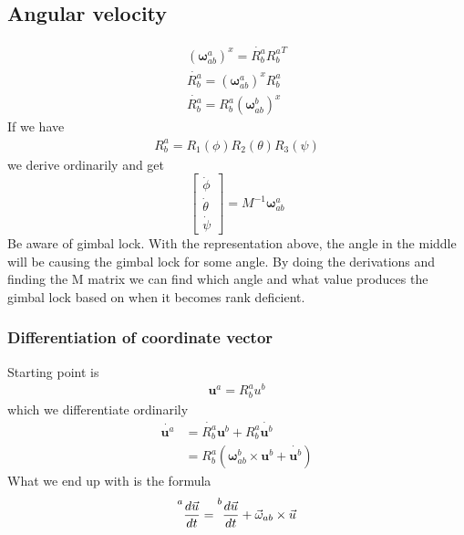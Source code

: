 \subsection{Angular velocity}
\begin{align}
    (\boldsymbol{\omega}_{ab}^a)^x=\dot{R_b^a} {R_b^a}^T \\
    \dot{R_b^a}=(\boldsymbol{\omega}_{ab}^a)^x R_b^a \\
    \dot{R_b^a}=R_b^a (\boldsymbol{\omega}_{ab}^b)^x 
\end{align}
If we have 
\begin{align}
    R_b^a = R_1(\phi) R_2(\theta) R_3(\psi)
\end{align}
we derive ordinarily and get
\begin{equation*}
    \begin{bmatrix}
    \dot{\phi} \\
    \dot{\theta} \\
    \dot{\psi}
    \end{bmatrix}
    =
    M^{-1}\boldsymbol{\omega}_{ab}^a
\end{equation*}
Be aware of gimbal lock. With the representation above, the angle in the middle will be causing the gimbal lock for some angle. By doing the derivations and finding the M matrix we can find which angle and what value produces the gimbal lock based on when it becomes rank deficient.

\subsubsection{Differentiation of coordinate vector}
Starting point is
\begin{align}
    \mathbf{u}^a=R_b^a u^b
\end{align}
which we differentiate ordinarily
\begin{align}
    \dot{\mathbf{u}^a} & =\dot{R_b^a}\mathbf{u}^b+R_b^a\dot{\mathbf{u}^b} \\
    & = R_b^a(\boldsymbol{\omega}_{ab}^b \times \mathbf{u}^b + \dot{\mathbf{u}^b})
\end{align}
What we end up with is the formula
\begin{align}
   \prescript{a}{}{\frac{d\Vec{u}}{dt}} = \prescript{b}{}{\frac{d\Vec{u}}{dt}}+ \Vec{\omega}_{ab} \times \Vec{u}
\end{align}

